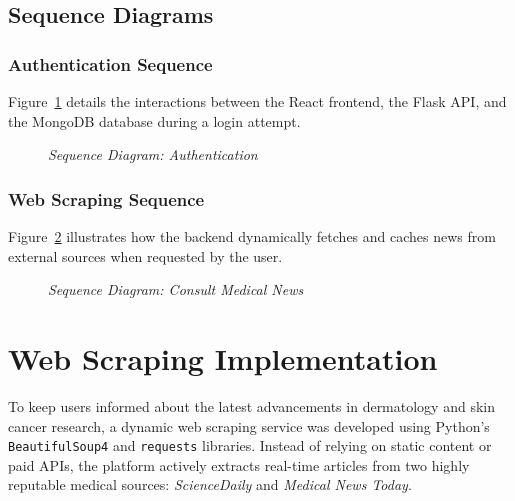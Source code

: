 \subsection{Sequence Diagrams}

\subsubsection{Authentication Sequence}
Figure~\ref{fig:sprint1_seq_auth} details the interactions between the React frontend, the Flask API, and the MongoDB database during a login attempt.

\begin{figure}[H]
    \centering
    \caption{\textit{Sequence Diagram: Authentication}}
    \label{fig:sprint1_seq_auth}
\end{figure}

\subsubsection{Web Scraping Sequence}
Figure~\ref{fig:sprint1_seq_news} illustrates how the backend dynamically fetches and caches news from external sources when requested by the user.

\begin{figure}[H]
    \centering
    \caption{\textit{Sequence Diagram: Consult Medical News}}
    \label{fig:sprint1_seq_news}
\end{figure}

\section{Web Scraping Implementation}
To keep users informed about the latest advancements in dermatology and skin cancer research, a dynamic web scraping service was developed using Python's \texttt{BeautifulSoup4} and \texttt{requests} libraries. Instead of relying on static content or paid APIs, the platform actively extracts real-time articles from two highly reputable medical sources: \textit{ScienceDaily} and \textit{Medical News Today}.

